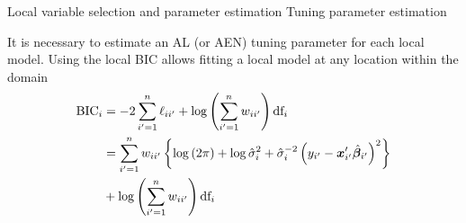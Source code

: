\documentclass[12pt,t]{beamer}
\newcommand{\subt}[1]{{\footnotesize \color{subtitle} {#1}}}
\begin{document}
\begin{frame}{Local variable selection and  parameter estimation}
\subt{Tuning parameter estimation}

\bigskip
It is necessary to estimate an AL (or AEN) tuning parameter for each local model. Using the local BIC allows fitting a local model at any location within the domain
	\begin{align}
		\mbox{BIC}_i &= -2 \sum_{i'=1}^n \ell_{ii'}  + \log \left( \sum_{i'=1}^n w_{ii'} \right) \mbox{df}_i\notag\\
		&= \sum_{i'=1}^n w_{ii'} \left\{ \log \left(2 \pi \right) + \log \hat{\sigma}_i^2 + \hat{\sigma}_i^{-2} \left(y_{i'} - \bm{x}_{i'}' \hat{\bm{\beta}}_{i'} \right)^2 \right\} \notag \\
		&+ \log \left( \sum_{i'=1}^n w_{ii'} \right) \mbox{df}_i \notag
	\end{align}


\end{frame}







\begin{comment}
\begin{frame}{Local variable selection and  parameter estimation}
\subt{Bandwidth parameter estimation}

\bigskip
Letting $H_i = \bm{W}_i \bm{X}\left(\bm{X}'\bm{W}_i\bm{X}\right)^{-1}\bm{X}'$, where $\bm{W}_i$ is the diagonal weight matrix diag$(w_{ii'})$,
 
\begin{align*}
  \hat{\bm{y}} = \bm{H} \bm{y}
\end{align*}

\note{note}
\end{frame}
\end{comment}
\end{document}
